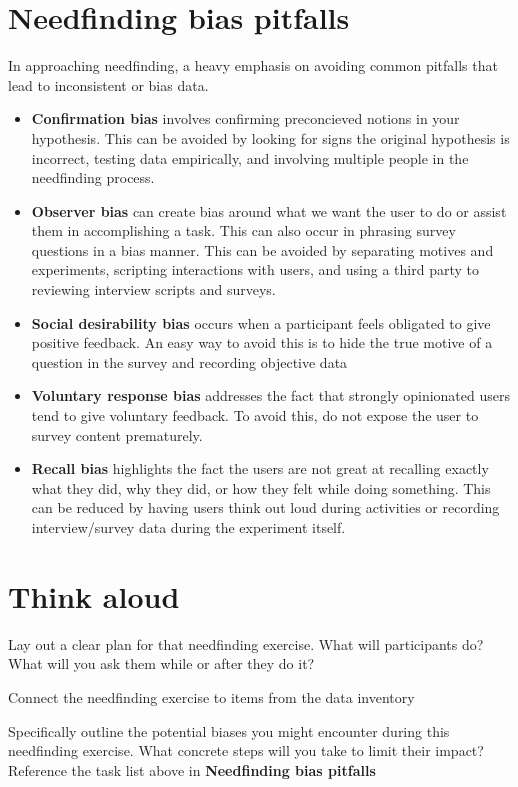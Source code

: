 \section{Needfinding bias pitfalls}

In approaching needfinding, a heavy emphasis on avoiding common pitfalls that lead to inconsistent or bias data.

\begin{itemize}
\item
  \textbf{Confirmation bias} involves confirming preconcieved notions in your hypothesis. This can be avoided by looking for signs the original hypothesis is incorrect, testing data empirically, and involving multiple people in the needfinding process.
\item
  \textbf{Observer bias} can create bias around what we want the user to do or assist them in accomplishing a task. This can also occur in phrasing survey questions in a bias manner. This can be avoided by separating motives and experiments, scripting interactions with users, and using a third party to reviewing interview scripts and surveys.
\item
  \textbf{Social desirability bias} occurs when a participant feels obligated to give positive feedback. An easy way to avoid this is to hide the true motive of a question in the survey and recording objective data
\item
  \textbf{Voluntary response bias} addresses the fact that strongly opinionated users tend to give voluntary feedback. To avoid this, do not expose the user to survey content prematurely.
\item
  \textbf{Recall bias} highlights the fact the users are not great at recalling exactly what they did, why they did, or how they felt while doing something. This can be reduced by having users think out loud during activities or recording interview/survey data during the experiment itself.
\end{itemize}


\section{Think aloud}
Lay out a clear plan for that needfinding exercise. What will participants do? What will you ask them while or after they do it?

Connect the needfinding exercise to items from the data inventory

Specifically outline the potential biases you might encounter during this needfinding exercise. What concrete steps will you take to limit their impact? Reference the task list above in \textbf{Needfinding bias pitfalls}

